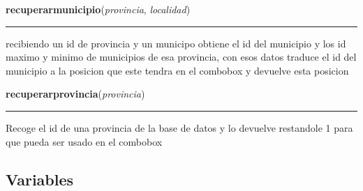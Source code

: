     \label{BDCA:recuperarmunicipio}

    \vspace{0.5ex}

\hspace{.8\funcindent}\begin{boxedminipage}{\funcwidth}

    \raggedright \textbf{recuperarmunicipio}(\textit{provincia}, \textit{localidad})

    \vspace{-1.5ex}

    \rule{\textwidth}{0.5\fboxrule}
\setlength{\parskip}{2ex}
    recibiendo un id de provincia y un municipo obtiene el id del municipio
    y los id maximo y minimo de municipios de esa provincia, con esos datos
    traduce el id del municipio a la posicion que este tendra en el 
    combobox y devuelve esta posicion

\setlength{\parskip}{1ex}
    \end{boxedminipage}

    \label{BDCA:recuperarprovincia}

    \vspace{0.5ex}

\hspace{.8\funcindent}\begin{boxedminipage}{\funcwidth}

    \raggedright \textbf{recuperarprovincia}(\textit{provincia})

    \vspace{-1.5ex}

    \rule{\textwidth}{0.5\fboxrule}
\setlength{\parskip}{2ex}
    Recoge el id de una provincia de la base de datos y lo devuelve 
    restandole 1 para que pueda ser usado en el combobox

\setlength{\parskip}{1ex}
    \end{boxedminipage}



  \subsection{Variables}


